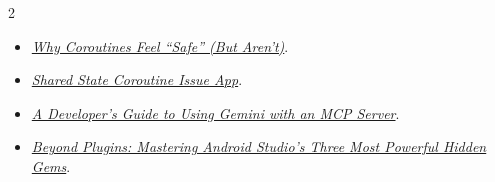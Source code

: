 \documentclass[10pt,a4paper,withhyper]{altacv}
\begin{document}
\begin{paracol}{2}





\begin{itemize}
	
	\item 	\href{https://medium.com/@slimaniiyassine/why-coroutines-feel-safe-but-arent-582a31ebe0d3}{\textit{Why Coroutines Feel “Safe” (But Aren’t)}}.
	
	\item	\href{https://github.com/slimaniiyassine/Medium-Article-Shared-State-Coroutine-Issue}{\textit{Shared State Coroutine Issue App}}.
	
	\item	\href{https://medium.com/@slimaniiyassine/a-developers-guide-to-using-gemini-with-an-mcp-server-05878c418097}{\textit{A Developer’s Guide to Using Gemini with an MCP Server}}.
	
		\item	\href{https://medium.com/@slimaniiyassine/beyond-plugins-mastering-android-studios-three-most-powerful-hidden-gems-b8210bbb0e89}{\textit{Beyond Plugins: Mastering Android Studio’s Three Most Powerful Hidden Gems}}.
	
\end{itemize}



\end{paracol}
\end{document}
